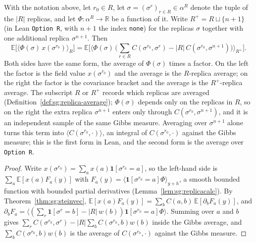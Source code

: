 \begin{theorem}\label{thm:sg:replica}
  \leanok
With the notation above, let $r_0\in R$, let $\sigma=(\sigma^r)_{r\in R}\in\alpha^R$ denote the tuple of the $|R|$ replicas,
and let $\Phi:\alpha^R\to\mathbb R$ be a function of it. Write $R^+=R\sqcup\{n+1\}$ (in Lean \texttt{Option R}, with $n+1$
the index \texttt{none}) for the replicas $\sigma$ together with one additional replica $\sigma^{n+1}$. Then
\[\mathbb E\Big[\big\langle\Phi(\sigma)\,x(\sigma^{r_0})\big\rangle_R\Big]
 =\mathbb E\Big[\Big\langle\Phi(\sigma)\,\Big(\sum_{r\in R}C(\sigma^{r_0},\sigma^r)-|R|\,C(\sigma^{r_0},\sigma^{n+1})\Big)\Big\rangle_{R^+}\Big].\]
Both sides have the same form, the average of $\Phi(\sigma)$ times a factor. On the left the factor is the field value
$x(\sigma^{r_0})$ and the average is the $R$-replica average; on the right the factor is the covariance bracket and the
average is the $R^+$-replica average. The subscript $R$ or $R^+$ records which replicas are averaged
(Definition~\ref{def:sg:replica-average}); $\Phi(\sigma)$ depends only on the replicas in $R$, so on the right the extra
replica $\sigma^{n+1}$ enters only through $C(\sigma^{r_0},\sigma^{n+1})$, and it is an independent sample of the same Gibbs measure.
Averaging over $\sigma^{n+1}$ alone turns this term into $\langle C(\sigma^{r_0},\cdot)\rangle$, an integral of $C(\sigma^{r_0},\cdot)$
against the Gibbs measure; this is the first form in Lean, and the second form is the average over \texttt{Option R}.
\end{theorem}

\begin{proof}
  \leanok
Write $x(\sigma^{r_0})=\sum_ax(a)\mathbf 1[\sigma^{r_0}=a]$, so the left-hand side is $\sum_a\mathbb E[x(a)F_a(y)]$ with
$F_a(y)=\langle\mathbf 1[\sigma^{r_0}=a]\Phi\rangle_{y+h}$, a smooth bounded function with bounded partial derivatives
(Lemma~\ref{lem:sg:replicacalc}). By Theorem~\ref{thm:sg:steinvec}, $\mathbb E[x(a)F_a(y)]=\sum_bC(a,b)\,\mathbb E[\partial_bF_a(y)]$, and
$\partial_bF_a=\langle(\sum_r\mathbf 1[\sigma^r=b]-|R|\,w(b))\mathbf 1[\sigma^{r_0}=a]\Phi\rangle$. Summing over $a$ and $b$ gives
$\sum_r C(\sigma^{r_0},\sigma^r)-|R|\sum_bC(\sigma^{r_0},b)w(b)$ inside the Gibbs average, and $\sum_bC(\sigma^{r_0},b)w(b)$ is
the average of $C(\sigma^{r_0},\cdot)$ against the Gibbs measure.
\end{proof}

